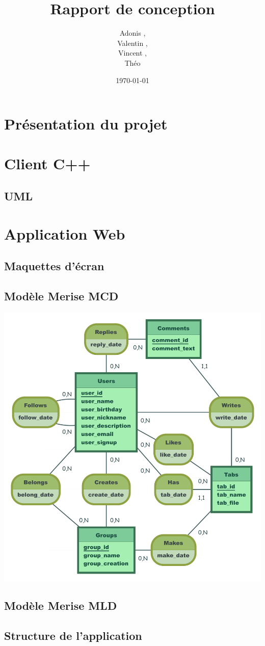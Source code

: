 \documentclass[a4paper]{article}
\title{Rapport de conception}
\author{Adonis \bsc{Najimi},\\
 Valentin \bsc{Stern},\\
 Vincent \bsc{Albert},\\
 Théo \bsc{Gerriet}}
\date{\today}
\begin{document}
\maketitle
\section{Présentation du projet}
\section{Client C++}
\subsection{UML}
\section{Application Web}
\subsection{Maquettes d'écran}
\subsection{Modèle Merise MCD}
\centerline{\includegraphics[scale=0.8]{MCD_MLD_Music}}
\subsection{Modèle Merise MLD}
\subsection{Structure de l'application}
\end{document}

